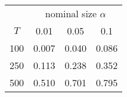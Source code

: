 % 
\begin{tabular}{cccc}
  \hline
  & \multicolumn{3}{c}{nominal size $\alpha$} \\
 $T$ & 0.01 & 0.05 & 0.1 \\
 \hline
100 & 0.007 & 0.040 & 0.086 \\ 
  250 & 0.113 & 0.238 & 0.352 \\ 
  500 & 0.510 & 0.701 & 0.795 \\ 
   \hline
\end{tabular}
